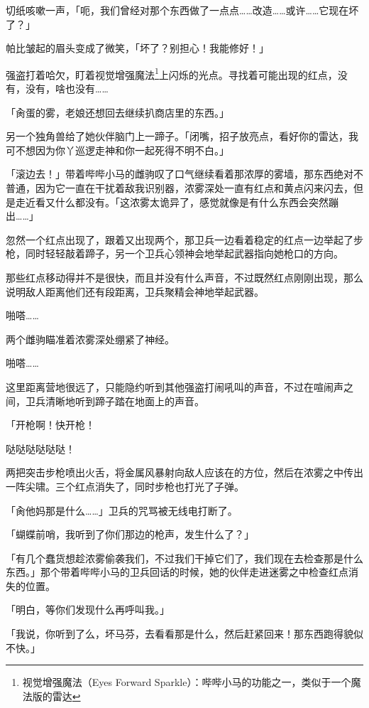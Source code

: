 切纸咳嗽一声，「呃，我们曾经对那个东西做了一点点……改造……或许……它现在坏了？」

帕比皱起的眉头变成了微笑，「坏了？别担心！我能修好！」

\horizonline


强盗打着哈欠，盯着视觉增强魔法\footnote{视觉增强魔法（Eyes Forward Sparkle）：哔哔小马的功能之一，类似于一个魔法版的雷达}上闪烁的光点。寻找着可能出现的红点，没有，没有，啥也没有……{}

「肏蛋的雾，老娘还想回去继续扒商店里的东西。」

另一个独角兽给了她伙伴脑门上一蹄子。「闭嘴，招子放亮点，看好你的雷达，我可不想因为你丫巡逻走神和你一起死得不明不白。」

「滚边去！」带着哔哔小马的雌驹叹了口气继续看着那浓厚的雾墙，那东西绝对不普通，因为它一直在干扰着敌我识别器，浓雾深处一直有红点和黄点闪来闪去，但是走近看又什么都没有。「这浓雾太诡异了，感觉就像是有什么东西会突然蹦出……」

忽然一个红点出现了，跟着又出现两个，那卫兵一边看着稳定的红点一边举起了步枪，同时轻轻敲着蹄子，另一个卫兵心领神会地举起武器指向她枪口的方向。

那些红点移动得并不是很快，而且并没有什么声音，不过既然红点刚刚出现，那么说明敌人距离他们还有段距离，卫兵聚精会神地举起武器。

啪嗒……{}

两个雌驹瞄准着浓雾深处绷紧了神经。

啪嗒……{}

这里距离营地很远了，只能隐约听到其他强盗打闹吼叫的声音，不过在喧闹声之间，卫兵清晰地听到蹄子踏在地面上的声音。

「开枪啊！快开枪！

哒哒哒哒哒哒！

两把突击步枪喷出火舌，将金属风暴射向敌人应该在的方位，然后在浓雾之中传出一阵尖啸。三个红点消失了，同时步枪也打光了子弹。

「肏他妈那是什么……」卫兵的咒骂被无线电打断了。

「蝴蝶前哨，我听到了你们那边的枪声，发生什么了？」

「有几个蠢货想趁浓雾偷袭我们，不过我们干掉它们了，我们现在去检查那是什么东西。」那个带着哔哔小马的卫兵回话的时候，她的伙伴走进迷雾之中检查红点消失的位置。

「明白，等你们发现什么再呼叫我。」

「我说，你听到了么，坏马芬，去看看那是什么，然后赶紧回来！那东西跑得貌似不快。」

